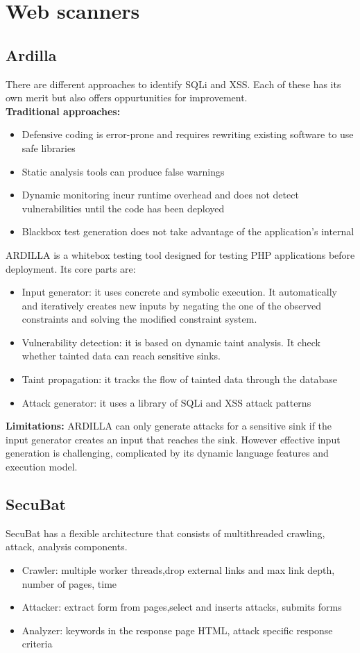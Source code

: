 \documentclass[10pt,a4paper]{article}
\begin{document}
\section{Web scanners}
\subsection{Ardilla}
There are different approaches to identify SQLi and XSS. Each of these has its own merit but also offers oppurtunities for improvement.\\
{\bf Traditional approaches:}
\begin{itemize}
\item Defensive coding is error-prone and requires rewriting existing software to use safe libraries
\item Static analysis tools can produce false warnings
\item Dynamic monitoring incur runtime overhead and does not detect vulnerabilities until the code has been deployed
\item Blackbox test generation does not take advantage of the application's internal
\end{itemize}
ARDILLA is a whitebox testing tool designed for testing PHP applications before deployment. Its core parts are:
\begin{itemize}
\item Input generator: it uses concrete and symbolic execution. It automatically and iteratively creates new inputs by negating the one of the observed constraints and solving the modified constraint system.
\item Vulnerability detection: it is based on dynamic taint analysis. It check whether tainted data can reach sensitive sinks.
\item Taint propagation: it tracks the flow of tainted data through the database
\item Attack generator: it uses a library of SQLi and XSS attack patterns
\end{itemize}
{\bf Limitations:} ARDILLA can only generate attacks for a sensitive sink if the input generator creates an input that reaches the sink. However effective input generation is challenging, complicated by its dynamic language features and execution model.
\subsection{SecuBat}
SecuBat has a flexible architecture that consists of multithreaded crawling, attack, analysis components.
\begin{itemize}
\item Crawler: multiple worker threads,drop external links and max link depth, number of pages, time
\item Attacker: extract form from pages,select and inserts attacks, submits forms
\item Analyzer: keywords in the response page HTML, attack specific response criteria
\end{itemize}
\end{document}
